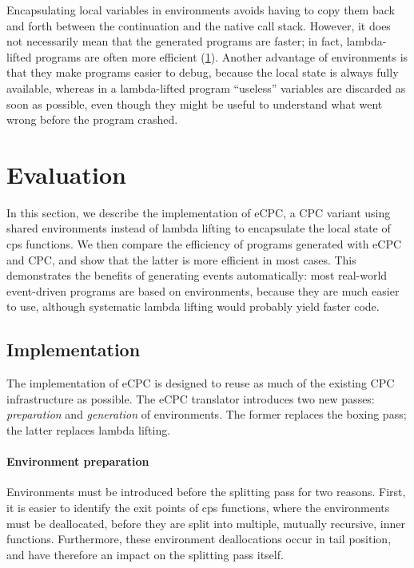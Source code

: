 \documentclass[a4paper]{llncs}
\begin{document}
Encapsulating local variables in environments avoids having to copy them back
and forth between the continuation and the native call stack.   However, it does
not necessarily mean that the generated programs are faster; in fact,
lambda-lifted programs are often more efficient (\cref{sec:ecpc}).
Another advantage of environments is that they make programs easier to debug, because
the local state is always fully available, whereas in a lambda-lifted program
``useless'' variables are discarded as soon as possible, even though they might
be useful to understand what went wrong before the program crashed.

\section{Evaluation}
\label{sec:ecpc}

In this section, we describe the implementation of eCPC, a CPC variant using
shared environments instead of lambda lifting to encapsulate the local state of
cps functions.  We then compare the efficiency of programs generated with eCPC
and CPC, and show that the latter is more efficient in most cases.  This
demonstrates the benefits of generating events automatically: most real-world
event-driven programs are based on environments, because they are much easier to
use, although systematic lambda lifting would probably yield faster code.

\subsection{Implementation}

The implementation of eCPC is designed to reuse as much of the existing CPC
infrastructure as possible.  The eCPC translator introduces two new passes:
\emph{preparation} and \emph{generation} of environments.   The former replaces
the boxing pass; the latter replaces lambda lifting.

\paragraph{Environment preparation}

Environments must be introduced before the splitting pass for two reasons.
First, it is easier to identify the exit points of cps functions, where the
environments must be deallocated, before they are split into multiple, mutually
recursive, inner functions.  Furthermore, these environment deallocations occur
in tail position, and have therefore an impact on the splitting pass itself.
\end{document}
